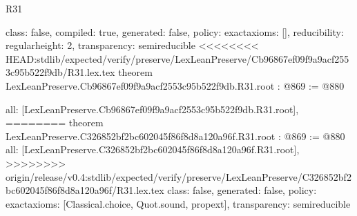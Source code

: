 \begin{lexlean}{R31}
\begin{coremodule}
{{{{{  class: false,
  compiled: true,
  generated: false,
  policy: exact{axioms: []},
  reducibility: regular{height: 2},
  transparency: semireducible
}
<<<<<<<< HEAD:stdlib/expected/verify/preserve/LexLeanPreserve/Cb96867ef09f9a9acf2553c95b522f9db/R31.lex.tex
theorem LexLeanPreserve.Cb96867ef09f9a9acf2553c95b522f9db.R31.root : @869 := @880 {
  all: [LexLeanPreserve.Cb96867ef09f9a9acf2553c95b522f9db.R31.root],
========
theorem LexLeanPreserve.C326852bf2bc602045f86f8d8a120a96f.R31.root : @869 := @880 {
  all: [LexLeanPreserve.C326852bf2bc602045f86f8d8a120a96f.R31.root],
>>>>>>>> origin/release/v0.4:stdlib/expected/verify/preserve/LexLeanPreserve/C326852bf2bc602045f86f8d8a120a96f/R31.lex.tex
  class: false,
  generated: false,
  policy: exact{axioms: [Classical.choice, Quot.sound, propext]},
  transparency: semireducible
}

}}}}}
\end{coremodule}
\end{lexlean}

